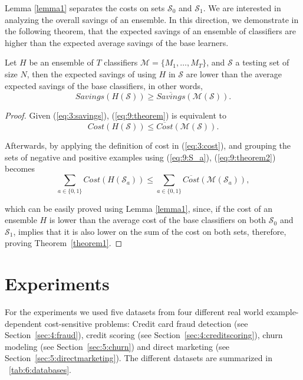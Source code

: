 {  Lemma \ref{lemma1} separates the costs on sets $\mathcal{S}_0$ and  $\mathcal{S}_1$. We are 
  interested in analyzing the overall savings of an ensemble. In this direction, we demonstrate 
  in the following theorem, that the expected savings of an ensemble of classifiers are higher 
  than the expected average savings of the base learners.
  
  \begin{theorem}\label{theorem1}
  Let $H$ be an ensemble of $T$ classifiers $\mathcal{M}=\{M_1,\dots,M_T\}$, and $\mathcal{S}$ a 
  testing set of size $ N $, then the expected savings of using $H$ in 
  $\mathcal{S}$ are lower than the average expected savings of the base classifiers, in other words,
  \begin{equation}\label{eq:9:theorem}
    Savings(H(\mathcal{S})) \ge \overline{Savings}(\mathcal{M}(\mathcal{S})). 
  \end{equation}
  \end{theorem}
  
  \begin{proof}
  Given (\ref{eq:3:savings}), (\ref{eq:9:theorem}) is equivalent to
  \begin{equation}\label{eq:9:theorem2}
    Cost(H(\mathcal{S})) \le \overline{Cost} (\mathcal{M}(\mathcal{S})). 
  \end{equation}

  \noindent Afterwards, by applying the definition of cost in (\ref{eq:3:cost}), and grouping the 
  sets of negative and positive examples using (\ref{eq:9:S_a}), (\ref{eq:9:theorem2}) becomes
  \begin{equation}
    \sum_{a\in \{0,1\}} Cost(H(\mathcal{S}_a)) \le \sum_{a\in \{0,1\}} \overline{Cost} (\mathcal{M} 
    (\mathcal{S}_a)),
  \end{equation}
  
  \noindent which can be easily proved using Lemma \ref{lemma1}, since, if the cost of an ensemble 
  $H$ is  lower than the average cost of the base classifiers on both $\mathcal{S}_0$ and 
  $\mathcal{S}_1$,  implies that it is also lower on the sum of the cost on both sets, 
  therefore, proving Theorem~\ref{theorem1}.
  \end{proof}
  
\section{Experiments}
\label{sec:9:experiments}

For the experiments we used five datasets from four different real world example-dependent 
cost-sensitive problems: Credit card fraud detection (see Section~\ref{sec:4:fraud}), credit 
scoring (see Section~\ref{sec:4:creditscoring}), churn modeling (see Section~\ref{sec:5:churn}) and 
direct marketing (see Section~\ref{sec:5:directmarketing}). The different datasets are summarized 
in \tablename{~\ref{tab:6:databases}}.

}
